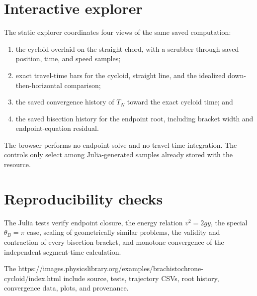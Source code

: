 \section{Interactive explorer}
The static explorer coordinates four views of the same saved computation:
\begin{enumerate}
\item the cycloid overlaid on the straight chord, with a scrubber through saved
      position, time, and speed samples;
\item exact travel-time bars for the cycloid, straight line, and the idealized
      down-then-horizontal comparison;
\item the saved convergence history of $T_N$ toward the exact cycloid time; and
\item the saved bisection history for the endpoint root, including bracket
      width and endpoint-equation residual.
\end{enumerate}
The browser performs no endpoint solve and no travel-time integration. The
controls only select among Julia-generated samples already stored with the
resource.

\section{Reproducibility checks}
The Julia tests verify endpoint closure, the energy relation $v^2=2gy$, the
special $\theta_B=\pi$ case, scaling of geometrically similar problems, the
validity and contraction of every bisection bracket, and monotone convergence
of the independent segment-time calculation.

The 
{https://images.physicslibrary.org/examples/brachistochrone-cycloid/index.html}
include source, tests, trajectory CSVs, root history, convergence data, plots,
and provenance.
